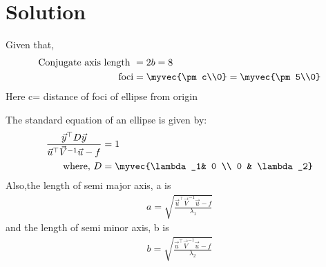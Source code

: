 \documentclass[journal,12pt,twocolumn]{IEEEtran}
\begin{document}
\section{Solution}
Given that,
\begin{align}
\text{Conjugate axis length }&= 2b = 8 \label{eqA}
  \\
\text{foci}&=\myvec{\pm c\\0} = \myvec{\pm5\\0} 
\end{align}
Here c= distance of foci of ellipse from origin
\begin{lemma}
\label{lemma}
The standard equation of an ellipse is given by:
\begin{align}
\frac{\vec{y}^{\top}D\vec{y}}{\vec{u}^{\top}\vec{V}^{-1}\vec{u}-f}&=1
\\
\text{where, } D &=\myvec{\lambda_1& 0 \\ 0 & \lambda_2}
\end{align}
Also,the length of semi major axis, a is
\begin{align}
  a = \sqrt{\frac{\vec{u}^{\top}\vec{V}^{-1}\vec{u}-f}{\lambda_1}} \label{eq1}
  \end{align}
 and the length of semi minor axis, b is
  \begin{align}
  b = \sqrt{\frac{\vec{u}^{\top}\vec{V}^{-1}\vec{u}-f}{\lambda_2}}
\end{align}
\end{lemma}
\end{document}
